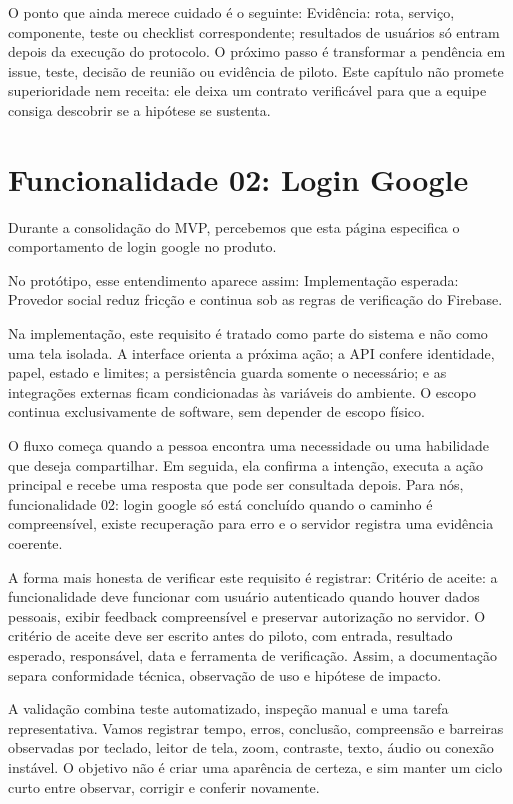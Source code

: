 \documentclass[12pt,oneside,a4paper,article]{abntex2}
\begin{document}
O ponto que ainda merece cuidado é o seguinte: Evidência: rota, serviço, componente, teste ou checklist correspondente; resultados de usuários só entram depois da execução do protocolo. O próximo passo é transformar a pendência em issue, teste, decisão de reunião ou evidência de piloto. Este capítulo não promete superioridade nem receita: ele deixa um contrato verificável para que a equipe consiga descobrir se a hipótese se sustenta.

\section{Funcionalidade 02: Login Google}
Durante a consolidação do MVP, percebemos que esta página especifica o comportamento de login google no produto.

No protótipo, esse entendimento aparece assim: Implementação esperada: Provedor social reduz fricção e continua sob as regras de verificação do Firebase.

Na implementação, este requisito é tratado como parte do sistema e não como uma tela isolada. A interface orienta a próxima ação; a API confere identidade, papel, estado e limites; a persistência guarda somente o necessário; e as integrações externas ficam condicionadas às variáveis do ambiente. O escopo continua exclusivamente de software, sem depender de escopo físico.

O fluxo começa quando a pessoa encontra uma necessidade ou uma habilidade que deseja compartilhar. Em seguida, ela confirma a intenção, executa a ação principal e recebe uma resposta que pode ser consultada depois. Para nós, funcionalidade 02: login google só está concluído quando o caminho é compreensível, existe recuperação para erro e o servidor registra uma evidência coerente.

A forma mais honesta de verificar este requisito é registrar: Critério de aceite: a funcionalidade deve funcionar com usuário autenticado quando houver dados pessoais, exibir feedback compreensível e preservar autorização no servidor. O critério de aceite deve ser escrito antes do piloto, com entrada, resultado esperado, responsável, data e ferramenta de verificação. Assim, a documentação separa conformidade técnica, observação de uso e hipótese de impacto.

A validação combina teste automatizado, inspeção manual e uma tarefa representativa. Vamos registrar tempo, erros, conclusão, compreensão e barreiras observadas por teclado, leitor de tela, zoom, contraste, texto, áudio ou conexão instável. O objetivo não é criar uma aparência de certeza, e sim manter um ciclo curto entre observar, corrigir e conferir novamente.
\end{document}

